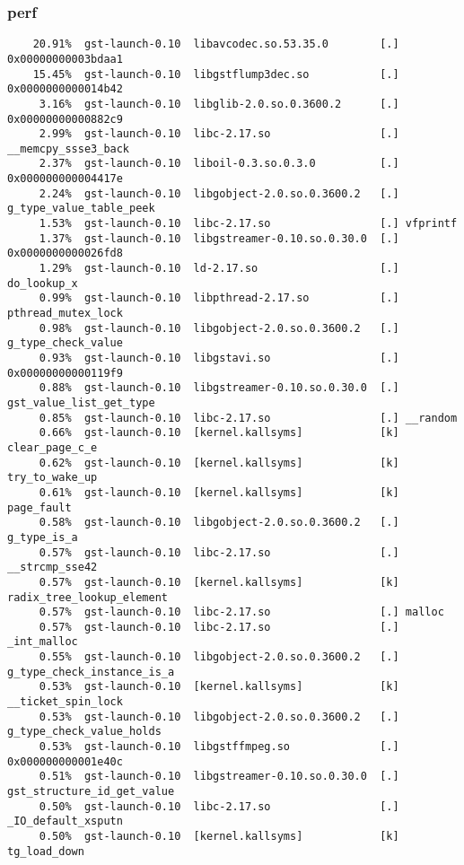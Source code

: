 \begin{frame}[fragile]
\frametitle{perf}
\begin{block}{}
\tiny
\begin{verbatim}
    20.91%  gst-launch-0.10  libavcodec.so.53.35.0        [.] 0x00000000003bdaa1
    15.45%  gst-launch-0.10  libgstflump3dec.so           [.] 0x0000000000014b42
     3.16%  gst-launch-0.10  libglib-2.0.so.0.3600.2      [.] 0x00000000000882c9
     2.99%  gst-launch-0.10  libc-2.17.so                 [.] __memcpy_ssse3_back
     2.37%  gst-launch-0.10  liboil-0.3.so.0.3.0          [.] 0x000000000004417e
     2.24%  gst-launch-0.10  libgobject-2.0.so.0.3600.2   [.] g_type_value_table_peek
     1.53%  gst-launch-0.10  libc-2.17.so                 [.] vfprintf
     1.37%  gst-launch-0.10  libgstreamer-0.10.so.0.30.0  [.] 0x0000000000026fd8
     1.29%  gst-launch-0.10  ld-2.17.so                   [.] do_lookup_x
     0.99%  gst-launch-0.10  libpthread-2.17.so           [.] pthread_mutex_lock
     0.98%  gst-launch-0.10  libgobject-2.0.so.0.3600.2   [.] g_type_check_value
     0.93%  gst-launch-0.10  libgstavi.so                 [.] 0x00000000000119f9
     0.88%  gst-launch-0.10  libgstreamer-0.10.so.0.30.0  [.] gst_value_list_get_type
     0.85%  gst-launch-0.10  libc-2.17.so                 [.] __random
     0.66%  gst-launch-0.10  [kernel.kallsyms]            [k] clear_page_c_e
     0.62%  gst-launch-0.10  [kernel.kallsyms]            [k] try_to_wake_up
     0.61%  gst-launch-0.10  [kernel.kallsyms]            [k] page_fault
     0.58%  gst-launch-0.10  libgobject-2.0.so.0.3600.2   [.] g_type_is_a
     0.57%  gst-launch-0.10  libc-2.17.so                 [.] __strcmp_sse42
     0.57%  gst-launch-0.10  [kernel.kallsyms]            [k] radix_tree_lookup_element
     0.57%  gst-launch-0.10  libc-2.17.so                 [.] malloc
     0.57%  gst-launch-0.10  libc-2.17.so                 [.] _int_malloc
     0.55%  gst-launch-0.10  libgobject-2.0.so.0.3600.2   [.] g_type_check_instance_is_a
     0.53%  gst-launch-0.10  [kernel.kallsyms]            [k] __ticket_spin_lock
     0.53%  gst-launch-0.10  libgobject-2.0.so.0.3600.2   [.] g_type_check_value_holds
     0.53%  gst-launch-0.10  libgstffmpeg.so              [.] 0x000000000001e40c
     0.51%  gst-launch-0.10  libgstreamer-0.10.so.0.30.0  [.] gst_structure_id_get_value
     0.50%  gst-launch-0.10  libc-2.17.so                 [.] _IO_default_xsputn
     0.50%  gst-launch-0.10  [kernel.kallsyms]            [k] tg_load_down
\end{verbatim}
\end{block}
\end{frame}


